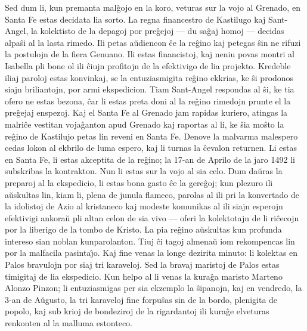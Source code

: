    Sed dum li, kun premanta mal\^gojo en la koro, veturas sur la vojo
al Grenado, en Santa Fe estas decidata lia sorto. La regna
financestro de Kastilugo kaj Sant-Angel, la kolektisto de la depagoj
por pre\^gejoj --- du sa\^gaj homoj --- decidas alpa\^si al la lasta
rimedo. Ili petas a\u udiencon \^ce la re\^gino kaj petegas \^sin ne
rifuzi la postulojn de la fiera Genuano. Ili estas financistoj, kaj
neniu povas montri al Isabella pli bone ol ili \^ciujn profitojn de
la efektivigo de lia projekto. Kredeble iliaj paroloj estas
konvinkaj, se la entuziasmigita re\^gino ekkrias, ke \^si prodonos
siajn briliantojn, por armi ekspedicion. Tiam Sant-Angel respondas
al \^si, ke tia ofero ne estas bezona, \^car li estas preta doni al
la re\^gino rimedojn prunte el la pre\^gejaj enspezoj. Kaj el Santa
Fe al Grenado jam rapidas kuriero, atingas la malri\^ce vestitan
voja\^ganton apud Grenado kaj raportas al li, ke \^sia mo\^sto la
re\^gino de Kastilujo petas lin reveni en Santa Fe. Denove la
malvarma malespero cedas lokon al ekbrilo de luma espero, kaj li
turnas la \^cevalon returnen. Li estas en Santa Fe, li estas
akceptita de la re\^gino; la 17-an de Aprilo de la jaro 1492 li
subskribas la kontrakton. Nun li estas sur la vojo al sia celo. Dum
da\u uras la preparoj al la ekspedicio, li estas bona gasto \^ce la
gere\^goj; kun plezuro ili a\u uskultas lin, kiam li, plena de
junula flameco, parolas al ili pri la konvertado de la idolistoj de
Azio al kristaneco kaj modeste komunikas al ili siajn esperojn
efektivigi ankora\u u pli altan celon de sia vivo --- oferi la
kolektotajn de li ri\^cecojn por la liberigo de la tombo de Kristo.
La pia re\^gino a\u uskultas kun profunda intereso sian noblan
kunparolanton. Tiuj \^ci tagoj almena\u u iom rekompencas lin por la
malfacila pasinta\^{\j}o. Kaj fine venas la longe dezirita minuto:
li kolektas en Palos bravulojn por siaj tri karaveloj. Sed la bravaj
maristoj de Palos estas timigitaj de lia ekspedicio. Kun helpo al li
venas la kura\^ga maristo Marteno Alonzo Pinzon; li entuziasmigas
per sia ekzemplo la \^sipanojn, kaj en vendredo, la 3-an de A\u
ugusto, la tri karaveloj fine forpu\^sas sin de la bordo, plenigita
de popolo, kaj sub krioj de bondeziroj de la rigardantoj ili
kura\^ge elveturas renkonten al la malluma estonteco.


